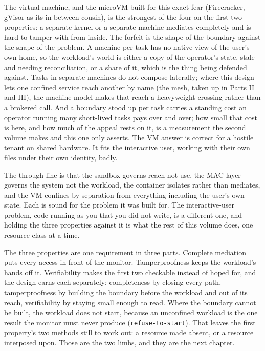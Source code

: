 The virtual machine, and the microVM built for this exact fear
(Firecracker, gVisor as its in-between cousin), is the strongest of the
four on the first two properties: a separate kernel or a separate
machine mediates completely and is hard to tamper with from inside. The
forfeit is the shape of the boundary against the shape of the problem. A
machine-per-task has no native view of the user's own home, so the
workload's world is either a copy of the operator's state, stale and
needing reconciliation, or a share of it, which is the thing being
defended against. Tasks in separate machines do not compose laterally;
where this design lets one confined service reach another by name (the
mesh, taken up in Parts II and III), the machine model makes that reach
a heavyweight crossing rather than a brokered call. And a boundary stood
up per task carries a standing cost an operator running many short-lived
tasks pays over and over; how small that cost is here, and how much of
the appeal rests on it, is a measurement the second volume makes and
this one only asserts. The VM answer is correct for a hostile tenant on
shared hardware. It fits the interactive user, working with their own
files under their own identity, badly.

The through-line is that the sandbox governs reach not use, the MAC
layer governs the system not the workload, the container isolates rather
than mediates, and the VM confines by separation from everything
including the user's own state. Each is sound for the problem it was
built for. The interactive-user problem, code running as you that you
did not write, is a different one, and holding the three properties
against it is what the rest of this volume does, one resource class at a
time.

The three properties are one requirement in three parts. Complete
mediation puts every access in front of the monitor. Tamperproofness
keeps the workload's hands off it. Verifiability makes the first two
checkable instead of hoped for, and the design earns each separately:
completeness by closing every path, tamperproofness by building the
boundary before the workload and out of its reach, verifiability by
staying small enough to read. Where the boundary cannot be built, the
workload does not start, because an unconfined workload is the one
result the monitor must never produce (\texttt{refuse-to-start}). That
leaves the first property's two methods still to work out: a resource
made absent, or a resource interposed upon. Those are the two limbs, and
they are the next chapter.
